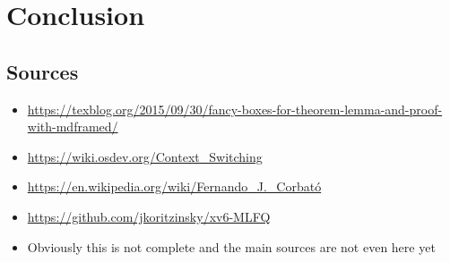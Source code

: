 \documentclass{report}
\begin{document}
\part{Conclusion}

\chapter*{Sources}

\begin{itemize}
    \item \url{https://texblog.org/2015/09/30/fancy-boxes-for-theorem-lemma-and-proof-with-mdframed/}
    \item \url{https://wiki.osdev.org/Context_Switching}
    \item \url{https://en.wikipedia.org/wiki/Fernando_J._Corbató}
    \item \url{https://github.com/jkoritzinsky/xv6-MLFQ}
    \item Obviously this is not complete and the main sources are not even here yet
\end{itemize}
\end{document}
